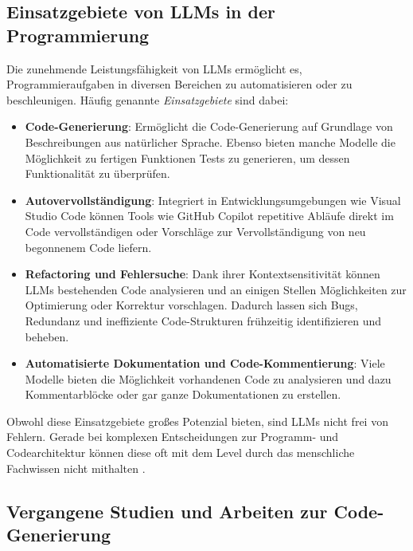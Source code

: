 \documentclass[11pt,a4paper]{article}
\begin{document}
\subsection{Einsatzgebiete von LLMs in der Programmierung}
\label{sec:einsatzgebiete}
Die zunehmende Leistungsfähigkeit von LLMs ermöglicht es, Programmieraufgaben in diversen Bereichen zu automatisieren oder zu beschleunigen. Häufig genannte \emph{Einsatzgebiete} sind dabei:
\begin{itemize}
    \item \textbf{Code-Generierung}:
    Ermöglicht die Code-Generierung auf Grundlage von Beschreibungen aus natürlicher Sprache\cite{chen2021evaluatinglargelanguagemodels}. Ebenso bieten manche Modelle die Möglichkeit zu fertigen Funktionen Tests zu generieren, um dessen Funktionalität zu überprüfen.
    \item \textbf{Autovervollständigung}:  
    Integriert in Entwicklungsumgebungen wie Visual Studio Code können Tools wie GitHub Copilot repetitive Abläufe direkt im Code vervollständigen oder Vorschläge zur Vervollständigung von neu begonnenem Code liefern\cite{chen2021evaluatinglargelanguagemodels}.
    \item \textbf{Refactoring und Fehlersuche}:  
    Dank ihrer Kontextsensitivität können LLMs bestehenden Code analysieren und an einigen Stellen Möglichkeiten zur Optimierung oder Korrektur vorschlagen\cite{chen2021evaluatinglargelanguagemodels,wang2021codet5identifierawareunifiedpretrained}. Dadurch lassen sich Bugs, Redundanz und ineffiziente Code-Strukturen frühzeitig identifizieren und beheben.
    \item \textbf{Automatisierte Dokumentation und Code-Kommentierung}:  
    Viele Modelle bieten die Möglichkeit vorhandenen Code zu analysieren und dazu Kommentarblöcke oder gar ganze Dokumentationen zu erstellen\cite{wang2021codet5identifierawareunifiedpretrained,jiang2024surveylargelanguagemodels}.
\end{itemize}
Obwohl diese Einsatzgebiete großes Potenzial bieten, sind LLMs nicht frei von Fehlern. Gerade bei komplexen Entscheidungen zur Programm- und Codearchitektur können diese oft mit dem Level durch das menschliche Fachwissen nicht mithalten \cite{dhar2024llmsgeneratearchitecturaldesign}.

\subsection{Vergangene Studien und Arbeiten zur Code-Generierung}
\label{sec:vergangene_studien}
\end{document}
